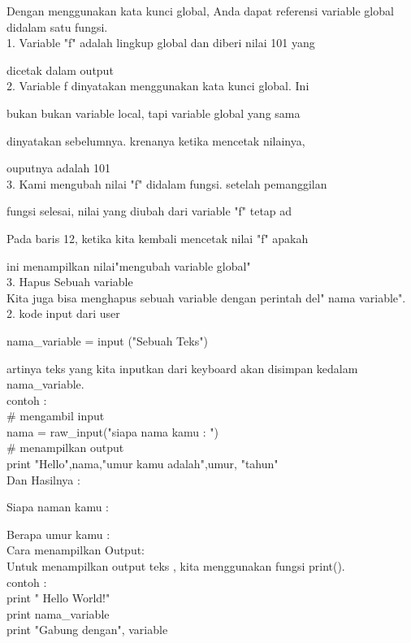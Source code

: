      Dengan menggunakan kata kunci global, Anda dapat referensi variable global didalam satu fungsi.\\
     1. Variable "f" adalah lingkup global dan diberi nilai 101 yang
     
     dicetak dalam output \\
     2. Variable f dinyatakan menggunakan kata kunci global. Ini
     
     bukan bukan variable local, tapi variable global yang sama
     
     dinyatakan sebelumnya. krenanya ketika mencetak nilainya,
     
     ouputnya adalah 101\\
     3. Kami mengubah nilai "f" didalam fungsi. setelah pemanggilan
     
     fungsi selesai, nilai yang diubah dari variable "f" tetap ad
     
     Pada baris 12, ketika kita kembali mencetak nilai "f" apakah
    
     ini menampilkan nilai"mengubah variable global"\\
     
     3. Hapus Sebuah variable\\
     
     Kita juga bisa menghapus sebuah variable dengan perintah del" nama variable".\\
2. kode input dari user

nama\_variable = input ("Sebuah Teks")

artinya teks yang kita inputkan dari keyboard akan disimpan kedalam nama\_variable.\\
contoh :\\
\# mengambil input \\
nama = raw\_input("siapa nama kamu : ")\\
\# menampilkan output \\
print "Hello",nama,"umur kamu adalah",umur, "tahun"\\

Dan Hasilnya :

Siapa naman kamu :

Berapa umur kamu : \\

Cara menampilkan Output:\\
Untuk menampilkan output teks , kita menggunakan fungsi print().\\
contoh :\\
print " Hello World!"\\
print nama\_variable\\
print "Gabung dengan", variable\\

